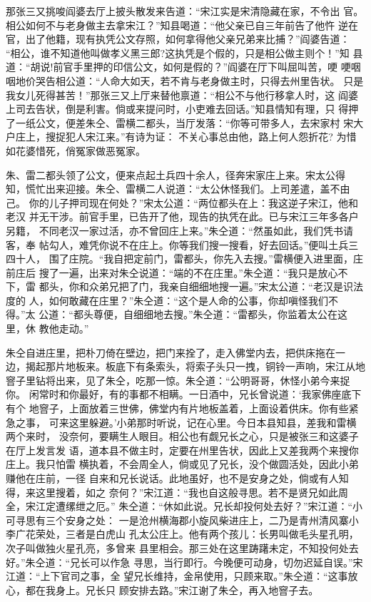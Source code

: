 那张三又挑唆阎婆去厅上披头散发来告道：“宋江实是宋清隐藏在家，不令出
官。相公如何不与老身做主去拿宋江？”知县喝道：“他父亲已自三年前告了他忤
逆在官，出了他籍，现有执凭公文存照，如何拿得他父亲兄弟来比捕？”阎婆告道：
“相公，谁不知道他叫做孝义黑三郎?这执凭是个假的，只是相公做主则个！”知
县道：“胡说!前官手里押的印信公文，如何是假的？”阎婆在厅下叫屈叫苦，哽
哽咽咽地价哭告相公道：“人命大如天，若不肯与老身做主时，只得去州里告状。
只是我女儿死得甚苦！”那张三又上厅来替他禀道：“相公不与他行移拿人时，这
阎婆上司去告状，倒是利害。倘或来提问时，小吏难去回话。”知县情知有理，只
得押了一纸公文，便差朱仝、雷横二都头，当厅发落：“你等可带多人，去宋家村
宋大户庄上，搜捉犯人宋江来。”有诗为证：
不关心事总由他，路上何人怨折花?
为惜如花婆惜死，俏冤家做恶冤家。

朱、雷二都头领了公文，便来点起土兵四十余人，径奔宋家庄上来。宋太公得
知，慌忙出来迎接。朱仝、雷横二人说道：“太公休怪我们。上司差遣，盖不由己。
你的儿子押司现在何处？”宋太公道：“两位都头在上：我这逆子宋江，他和老汉
并无干涉。前官手里，已告开了他，现告的执凭在此。已与宋江三年多各户另籍，
不同老汉一家过活，亦不曾回庄上来。”朱仝道：“然虽如此，我们凭书请客，奉
帖勾人，难凭你说不在庄上。你等我们搜一搜看，好去回话。”便叫土兵三四十人，
围了庄院。“我自把定前门，雷都头，你先入去搜。”雷横便入进里面，庄前庄后
搜了一遍，出来对朱仝说道：“端的不在庄里。”朱仝道：“我只是放心不下，雷
都头，你和众弟兄把了门，我亲自细细地搜一遍。”宋太公道：“老汉是识法度的
人，如何敢藏在庄里？”朱仝道：“这个是人命的公事，你却嗔怪我们不得。”太
公道：“都头尊便，自细细地去搜。”朱仝道：“雷都头，你监着太公在这里，休
教他走动。”

朱仝自进庄里，把朴刀倚在壁边，把门来拴了，走入佛堂内去，把供床拖在一
边，揭起那片地板来。板底下有条索头，将索子头只一拽，铜铃一声响，宋江从地
窨子里钻将出来，见了朱仝，吃那一惊。朱仝道：“公明哥哥，休怪小弟今来捉你。
闲常时和你最好，有的事都不相瞒。一日酒中，兄长曾说道：‘我家佛座底下有个
地窨子，上面放着三世佛，佛堂内有片地板盖着，上面设着供床。你有些紧急之事，
可来这里躲避。’小弟那时听说，记在心里。今日本县知县，差我和雷横两个来时，
没奈何，要瞒生人眼目。相公也有觑兄长之心，只是被张三和这婆子在厅上发言发
语，道本县不做主时，定要在州里告状，因此上又差我两个来搜你庄上。我只怕雷
横执着，不会周全人，倘或见了兄长，没个做圆活处，因此小弟赚他在庄前，一径
自来和兄长说话。此地虽好，也不是安身之处，倘或有人知得，来这里搜着，如之
奈何？”宋江道：“我也自这般寻思。若不是贤兄如此周全，宋江定遭缧绁之厄。”
朱仝道：“休如此说。兄长却投何处去好？”宋江道：“小可寻思有三个安身之处：
一是沧州横海郡小旋风柴进庄上，二乃是青州清风寨小李广花荣处，三者是白虎山
孔太公庄上。他有两个孩儿：长男叫做毛头星孔明，次子叫做独火星孔亮，多曾来
县里相会。那三处在这里踌躇未定，不知投何处去好。”朱仝道：“兄长可以作急
寻思，当行即行。今晚便可动身，切勿迟延自误。”宋江道：“上下官司之事，全
望兄长维持，金帛使用，只顾来取。”朱仝道：“这事放心，都在我身上。兄长只
顾安排去路。”宋江谢了朱仝，再入地窨子去。

